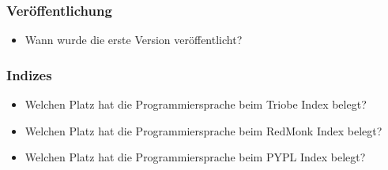 \subsubsection{Veröffentlichung}
\begin{itemize}
	\item Wann wurde die erste Version veröffentlicht?
\end{itemize}

\subsubsection{Indizes}
\begin{itemize}
	\item Welchen Platz hat die Programmiersprache beim Triobe Index belegt?
	\item Welchen Platz hat die Programmiersprache beim RedMonk Index belegt?
	\item Welchen Platz hat die Programmiersprache beim \gls{PYPL} Index belegt?
\end{itemize}
 
